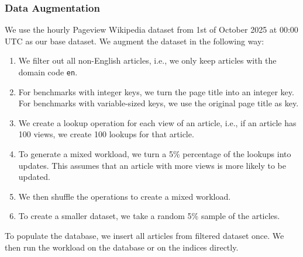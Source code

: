 \subsubsection*{Data Augmentation}
We use the hourly Pageview Wikipedia dataset from 1st of October 2025 at 00:00 UTC as our base dataset.
We augment the dataset in the following way:
\begin{enumerate}
    \item We filter out all non-English articles, i.e., we only keep articles with the domain code \texttt{en}.
    \item For benchmarks with integer keys, we turn the page title into an integer key. For benchmarks with variable-sized keys, we use the original page title as key.
    \item We create a lookup operation for each view of an article, i.e., if an article has 100 views, we create 100 lookups for that article.
    \item To generate a mixed workload, we turn a 5\% percentage of the lookups into updates. This assumes that an article with more views is more likely to be updated.
    \item We then shuffle the operations to create a mixed workload.
    \item To create a smaller dataset, we take a random 5\% sample of the articles.
\end{enumerate}

To populate the database, we insert all articles from filtered dataset once.
We then run the workload on the database or on the indices directly.


